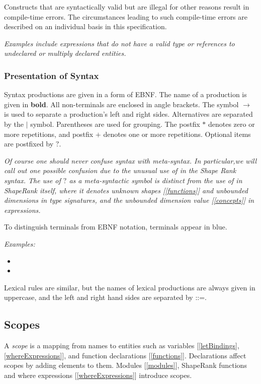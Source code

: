 \documentclass{article}
\begin{document}
Constructs that are syntactically valid but are illegal for other reasons result in compile-time errors. The circumstances leading to such compile-time errors are described on an individual basis in this specification.

{\em
Examples include expressions that do not have a valid type or references to undeclared or multiply declared entities.
}

\subsubsection{Presentation of Syntax}

Syntax productions are given in a form of EBNF. The name of a production is given in {\bf bold}.  All non-terminals are enclosed in angle brackets. The symbol $\rightarrow$ is used to separate a production's left and right sides. Alternatives are separated by the $|$ symbol. Parentheses are used for grouping. The postfix $*$ denotes zero or more repetitions, and postfix $+$ denotes one or more repetitions. Optional items are postfixed by $?$. 

{\em
Of course one should never confuse syntax with meta-syntax. In particular,we will call out one possible confusion due to the unusual use of \QUESTIONMARK{} in the Shape Rank syntax. The use of $?$ as a meta-syntactic symbol  is distinct from the use of \QUESTIONMARK{} in ShapeRank itself, where it denotes unknown shapes [\ref{functions}] and unbounded dimensions in type
signatures, and the unbounded dimension value [\ref{concepts}] in expressions.
}

To distinguish terminals from EBNF notation, terminals appear in {\color{blue} blue}.

{\em Examples:}
\begin{itemize}
\item \BuiltinType
\item  \HyperstreamLiteral
\end{itemize}


Lexical rules are similar, but the names of lexical productions are always given in uppercase, and the left and right hand sides are separated by ::=.

\subsection{Scopes}
\label{scopes}

A {\em scope} is a mapping from names to entities such as variables [\ref{letBindings}, \ref{whereExpressions}], and function declarations [\ref{functions}]. 
Declarations affect scopes by adding elements to them. 
Modules [\ref{modules}], ShapeRank functions and where expressions [\ref{whereExpressions}] introduce scopes. 
\end{document}

